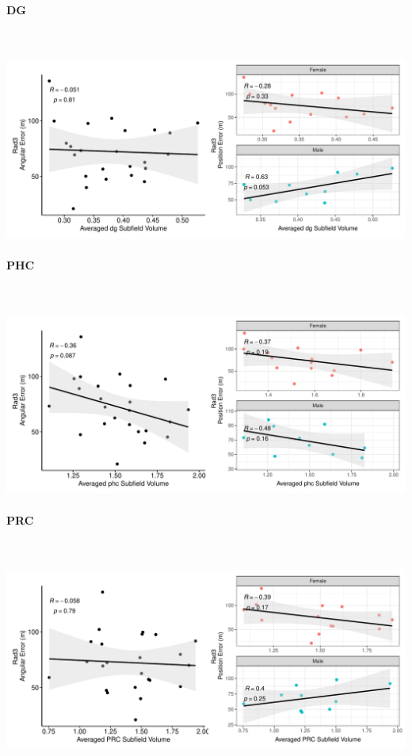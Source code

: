 \documentclass[
]{article}
\begin{document}
\newpage
\paragraph{DG}

~ \vspace{1cm}

\includegraphics{hippocampal_subfield_files/figure-latex/unnamed-chunk-10-1.pdf}

\paragraph{PHC}

~ \vspace{1cm}

\includegraphics{hippocampal_subfield_files/figure-latex/unnamed-chunk-11-1.pdf}

\newpage
\paragraph{PRC}

~ \vspace{1cm}

\includegraphics{hippocampal_subfield_files/figure-latex/unnamed-chunk-12-1.pdf}
\end{document}
